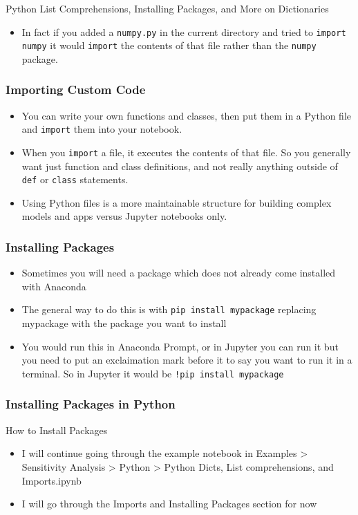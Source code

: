 \documentclass[handout, 11pt]{beamer}
\begin{document}
\begin{section}{Python List Comprehensions, Installing Packages, and More on Dictionaries}
\begin{frame}
\begin{itemize}
\vfill
\item In fact if you added a
\texttt{numpy.py}
in the current directory and tried to
\texttt{import}
\texttt{numpy}
it would
\texttt{import}
the contents of that file rather than the
\texttt{numpy}
package.
\end{itemize}
\end{frame}
\begin{frame}
\frametitle{Importing Custom Code}
\begin{itemize}
\item You can write your own functions and classes, then put them in a Python file and
\texttt{import}
them into your notebook.
\vfill
\item When you
\texttt{import}
a file, it executes the contents of that file. So you generally want just function and class definitions, and not really anything outside of
\texttt{def}
or
\texttt{class}
statements.
\vfill
\item Using Python files is a more maintainable structure for building complex models and apps versus Jupyter notebooks only.
\end{itemize}
\end{frame}
\begin{frame}
\frametitle{Installing Packages}
\begin{itemize}
\item Sometimes you will need a package which does not already come installed with Anaconda
\vfill
\item The general way to do this is with
\texttt{pip install mypackage}
replacing mypackage with
the package you want to install
\vfill
\item You would run this in Anaconda Prompt, or in Jupyter you can run it but you need to put an exclaimation mark before it to say you want to run it in a terminal. So in Jupyter it would be
\texttt{!pip install mypackage}
\end{itemize}
\end{frame}
\begin{frame}
\frametitle{Installing Packages in Python}
{
\begin{block}{How to Install Packages}
\begin{itemize}
\item I will continue going through the example notebook in Examples > Sensitivity Analysis > Python > Python Dicts, List comprehensions, and Imports.ipynb
\item I will go through the Imports and Installing Packages section for now
\end{itemize}
\end{block}
}
\end{frame}
\end{section}
\end{document}
